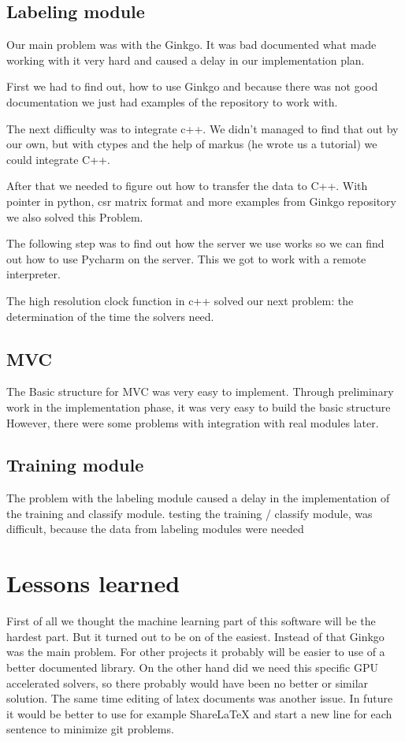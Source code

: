 \documentclass[parskip=full]{scrartcl}
\begin{document}
\subsection{Labeling module}
Our main problem was with the \gls{Ginkgo}. 
It was bad documented what made working with it very hard and caused a delay in our implementation plan. 

First we had to find out, how to use \gls{Ginkgo} and because there was not good documentation we just had examples of the repository to work with.

The next difficulty was to integrate c++.
We didn't managed to find that out by our own, but with ctypes and the help of markus (he wrote us a tutorial) we could integrate C++.

After that we needed to figure out how to transfer the data to C++.
With pointer in python, csr matrix format and more examples from Ginkgo repository we also solved this Problem.

The following step was to find out how the server we use works so we can find out how to use Pycharm on the server.
This we got to work with a remote interpreter.

The high resolution clock function in c++ solved our next problem: the determination of the time the solvers need.


\subsection{MVC}
The Basic structure for MVC was very easy to implement.
Through preliminary work in the implementation phase, it was very easy to build the basic structure 
However, there were some problems with integration with real modules later.
\subsection{Training module}
The problem with the labeling module caused a delay in the implementation of the training and classify module.
testing the training / classify module, was difficult, because the data from labeling modules were needed
\section{Lessons learned}
First of all we thought the machine learning part of this software will be the hardest part.
But it turned out to be on of the easiest.
Instead of that \gls{Ginkgo} was the main problem.
For other projects it probably will be easier to use of a better documented library.
On the other hand did we need this specific GPU accelerated solvers, so there probably would have been no better or similar solution.
The same time editing of latex documents was another issue.
In future it would be better to use for example ShareLaTeX and start a new line for each sentence to minimize git problems.
\end{document}
